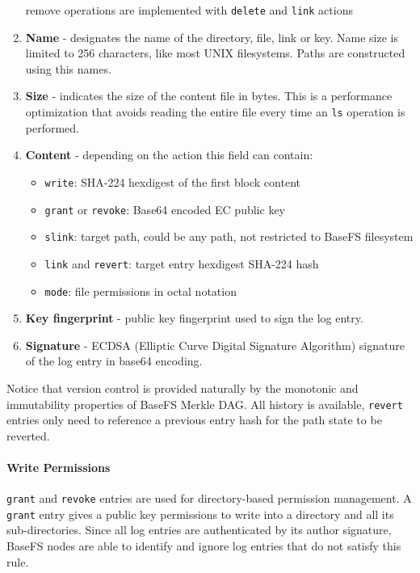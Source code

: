 \documentclass{sig-alternate}
\begin{document}
\begin{enumerate}
remove operations are implemented with \texttt{delete} and \texttt{link} actions
\item \textbf{Name} - designates the name of the directory, file, link or key. Name size is limited to 256 characters, like most UNIX filesystems. Paths are constructed using this names.
\item \textbf{Size} - indicates the size of the content file in bytes. This is a performance optimization that avoids reading the entire file every time an \texttt{ls} operation is performed.
\item \textbf{Content} - depending on the action this field can contain:
    \begin{itemize}
    \item \texttt{write}: SHA-224 hexdigest of the first block content
    \item \texttt{grant} or \texttt{revoke}: Base64 encoded EC public key
    \item \texttt{slink}: target path, could be any path, not restricted to BaseFS filesystem
    \item \texttt{link} and \texttt{revert}: target entry hexdigest SHA-224 hash
    \item \texttt{mode}: file permissions in octal notation
    \end{itemize}
\item \textbf{Key fingerprint} - public key fingerprint used to sign the log entry.
\item \textbf{Signature} - ECDSA (Elliptic Curve Digital Signature Algorithm) signature of the log entry in base64 encoding.
\end{enumerate}

Notice that version control is provided naturally by the monotonic and immutability properties of BaseFS Merkle DAG. All history is available, \texttt{revert} entries only need to reference a previous entry hash for the path state to be reverted.

\paragraph{Write Permissions}

\texttt{grant} and \texttt{revoke} entries are used for directory-based permission management. A \texttt{grant} entry gives a public key permissions to write into a directory and all its sub-directories. Since all log entries are authenticated by its author signature, BaseFS nodes are able to identify and ignore log entries that do not satisfy this rule. 
\end{document}
